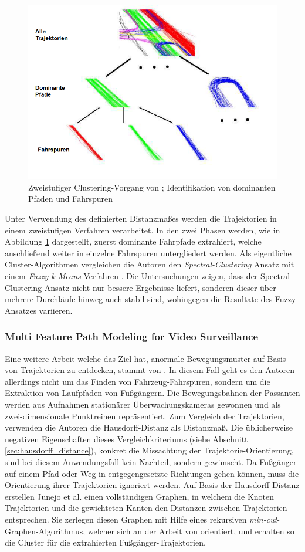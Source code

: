 \begin{figure}[H]
    \centering
    \includegraphics[width=0.5\linewidth]{resources/img/RelatedWork/Fu_HierarchicalClustering}
    \caption[Zweistufiger Clustering-Vorgang von Hu et al.]{Zweistufiger Clustering-Vorgang von \cite[]{Hu2005}; Identifikation von dominanten Pfaden und Fahrspuren}
    \label{fig:relw_hu_two_step_cluster}
\end{figure}

Unter Verwendung des definierten Distanzmaßes werden die Trajektorien in einem zweistufigen Verfahren verarbeitet.
In den zwei Phasen werden, wie in Abbildung \ref{fig:relw_hu_two_step_cluster} dargestellt, zuerst dominante
Fahrpfade extrahiert, welche anschließend weiter in einzelne Fahrspuren untergliedert werden.
Als eigentliche Cluster-Algorithmen vergleichen die Autoren den \textit{Spectral-Clustering} Ansatz \cite[]{Ng2002}
mit einem \textit{Fuzzy-k-Means} Verfahren \cite[]{xie1991validity}.
Die Untersuchungen zeigen, dass der Spectral Clustering Ansatz nicht nur bessere Ergebnisse liefert, sonderen dieser
über mehrere Durchläufe hinweg auch stabil sind, wohingegen die Resultate des Fuzzy-Ansatzes variieren.


\subsubsection*{Multi Feature Path Modeling for Video Surveillance}
Eine weitere Arbeit welche das Ziel hat, anormale Bewegungsmuster auf Basis von Trajektorien zu entdecken,
stammt von \cite[]{Junejo2004}. In diesem Fall geht es den Autoren allerdings nicht um das Finden von Fahrzeug-Fahrspuren,
sondern um die Extraktion von Laufpfaden von Fußgängern.
Die Bewegungsbahnen der Passanten werden aus Aufnahmen stationärer Überwachungskameras gewonnen und
als zwei-dimensionale Punktreihen repräsentiert.
Zum Vergleich der Trajektorien, verwenden die Autoren die Hausdorff-Distanz als Distanzmaß.
Die üblicherweise negativen Eigenschaften dieses
Vergleichkriteriums (siehe Abschnitt \ref{sec:hausdorff_distance}), konkret die Missachtung der
Trajektorie-Orientierung, sind bei diesem Anwendungsfall kein Nachteil, sondern gewünscht.
Da Fußgänger auf einem Pfad oder Weg in entgegengesetzte Richtungen gehen können, muss die Orientierung
ihrer Trajektorien ignoriert werden.
Auf Basis der Hausdorff-Distanz erstellen Junejo et al. einen vollständigen Graphen, in welchem die Knoten Trajektorien
und die gewichteten Kanten den Distanzen zwischen Trajektorien entsprechen.
Sie zerlegen diesen Graphen mit Hilfe eines rekursiven \textit{min-cut}-Graphen-Algorithmus, welcher sich
an der Arbeit von \cite[]{boykov2004experimental} orientiert, und erhalten so die Cluster für die
extrahierten Fußgänger-Trajektorien.

